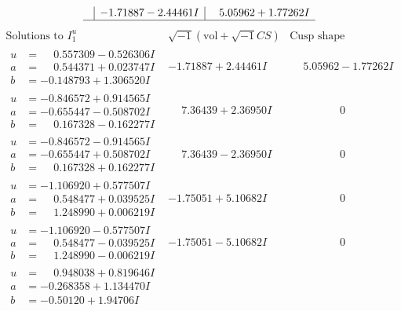 \documentclass[1p]{elsarticle_modified}
\theoremstyle{definition}
\newcommand{\I}{\sqrt{-1}}
\begin{document}
$$\begin{array}{c|c|c}
 & -1.71887 - 2.44461 I & \phantom{-}5.05962 + 1.77262 I\\
 \hline 
 \end{array}$$\newpage$$\begin{array}{c|c|c}  
\text{Solutions to }I^u_{1}& \I (\text{vol} + \sqrt{-1}CS) & \text{Cusp shape}\\
 \hline 
\begin{aligned}
u &= \phantom{-}0.557309 - 0.526306 I \\
a &= \phantom{-}0.544371 + 0.023747 I \\
b &= -0.148793 + 1.306520 I\end{aligned}
 & -1.71887 + 2.44461 I & \phantom{-}5.05962 - 1.77262 I \\ \hline\begin{aligned}
u &= -0.846572 + 0.914565 I \\
a &= -0.655447 - 0.508702 I \\
b &= \phantom{-}0.167328 - 0.162277 I\end{aligned}
 & \phantom{-}7.36439 + 2.36950 I & \phantom{-0.000000 } 0 \\ \hline\begin{aligned}
u &= -0.846572 - 0.914565 I \\
a &= -0.655447 + 0.508702 I \\
b &= \phantom{-}0.167328 + 0.162277 I\end{aligned}
 & \phantom{-}7.36439 - 2.36950 I & \phantom{-0.000000 } 0 \\ \hline\begin{aligned}
u &= -1.106920 + 0.577507 I \\
a &= \phantom{-}0.548477 + 0.039525 I \\
b &= \phantom{-}1.248990 + 0.006219 I\end{aligned}
 & -1.75051 + 5.10682 I & \phantom{-0.000000 } 0 \\ \hline\begin{aligned}
u &= -1.106920 - 0.577507 I \\
a &= \phantom{-}0.548477 - 0.039525 I \\
b &= \phantom{-}1.248990 - 0.006219 I\end{aligned}
 & -1.75051 - 5.10682 I & \phantom{-0.000000 } 0 \\ \hline\begin{aligned}
u &= \phantom{-}0.948038 + 0.819646 I \\
a &= -0.268358 + 1.134470 I \\
b &= -0.50120 + 1.94706 I\end{aligned}

\end{array}$$
\end{document}
